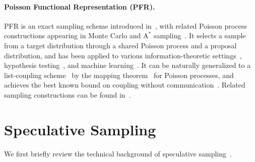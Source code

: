\documentclass{article}
\theoremstyle{plain}
\theoremstyle{definition}
\begin{document}
\paragraph{Poisson Functional Representation (PFR).}

PFR is an exact sampling scheme introduced in~\citep{li2018strong}, with related Poisson process constructions appearing in Monte Carlo and $\mathrm{A}^*$ sampling~\citep{maddison2014sampling, maddison2016poisson}.
It selects a sample from a target distribution through a shared Poisson process and a proposal distribution, and has been applied to various information-theoretic settings~\citep{li2021unified, liu2025one, hentila2024communication, khisti2024unequal}, hypothesis testing~\citep{guo2024hypothesis}, and machine learning~\citep{li2020minimax, he2024accelerating}.
It can be naturally generalized to a list-coupling scheme~\citep{li2021unified, li2019pairwise} by the mapping theorem~\citep{last2017lectures} for Poisson processes, and achieves the best known bound on coupling without communication~\citep{daliri2025coupling, rowan2025list}. 
Related sampling constructions can be found in~\citep{flamich2024greedy, liu2024universal, li2024channel}. 




\section{Speculative Sampling}
\label{sec::spec}


We first briefly review the technical background  of speculative sampling~\citep{chen2023accelerating,leviathan2023fast,sun2023spectr}. 
\end{document}
